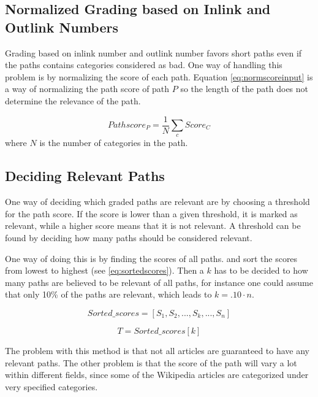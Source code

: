 \subsection{Normalized Grading based on Inlink and Outlink Numbers}
Grading based on inlink number and outlink number favors short paths even if the paths contains categories considered as bad. One way of handling this problem is by normalizing the score of each path. Equation \ref{eq:normscoreinput} is a way of normalizing the path score of path $P$ so the length of the path does not determine the relevance of the path. 


\begin{equation} \label{eq:normscoreinput}
Pathscore_{P} = \frac{1}{N} \sum_{c} Score_{C}
\end{equation}
where $N$ is the number of categories in the path.


\subsection{Deciding Relevant Paths}
One way of deciding which graded paths are relevant are by choosing a threshold for the path score. If the score is lower than a given threshold, it is marked as relevant, while a  higher score means that it is not relevant. A threshold can be found by deciding how many paths should be considered relevant.

One way of doing this is by finding the scores of all paths. and sort the scores from lowest to highest (see \ref{eq:sortedscores}). Then a $k$ has to be decided to how many paths are believed to be relevant of all paths, for instance one could assume that only 10\% of the paths are relevant, which leads to $k = .10 \cdot n$. 

\begin{equation} \label{eq:sortedscores}
Sorted\_scores = \left[ S_{1}, S_{2}, ... , S_{k}, ... , S_{n} \right]
\end{equation}



\begin{equation} \label{eq:threshold}
T = Sorted\_scores[k]
\end{equation}


The problem with this method is that not all articles are guaranteed to have any relevant paths. The other problem is that the score of the path will vary a lot within different fields, since some of the Wikipedia articles are categorized under very specified categories. 

